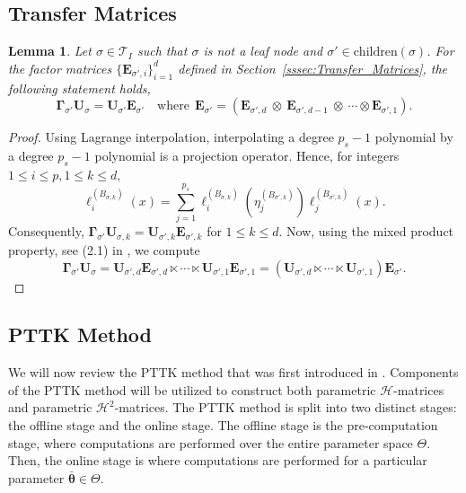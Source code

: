 \documentclass[final,3p,times]{elsarticle}
\newcommand{\mc}[1]{\mathcal{#1}}
\renewcommand{\vec}[1]{\boldsymbol{#1}}
\newcommand{\mat}[1]{\boldsymbol{#1}}
\newtheorem{lemma}{Lemma}
\begin{document}
\subsection{Transfer Matrices}
\begin{lemma}\label{lem:transfer}
Let $\sigma \in \mc{T}_{I}$ such that $\sigma$ is not a leaf node and $\sigma' \in \text{children}(\sigma)$. For the factor matrices $\{\mat{E}_{\sigma', i} \}_{i=1}^{d}$ defined in Section~\ref{sssec:Transfer_Matrices}, the following statement holds,
$$\mat{\Gamma}_{\sigma'}\mat{U}_{\sigma} = \mat{U}_{\sigma'}\mat{E}_{\sigma'} \quad \text{where}  ~~\mat{E}_{\sigma'} = (\mat{E}_{\sigma', d} ~\otimes~ \mat{E}_{\sigma', d-1} ~ \otimes ~ \cdots \otimes \mat{E}_{\sigma', 1}).$$
\end{lemma}
\begin{proof}
Using Lagrange interpolation, interpolating a degree $p_{s}-1$ polynomial by a degree $p_{s}-1$ polynomial is a projection operator. Hence, for  integers $1\le i \le p, 1 \le k \le d$, 
$$\ell_{i}^{(B_{\sigma, k})}(x) = \sum_{j=1}^{p_s}\ell_{i}^{(B_{\sigma, k})}(\eta_{j}^{(B_{\sigma', k})})\ell_{j}^{(B_{\sigma', k})}(x).$$
Consequently, $ \mat{\Gamma}_{\sigma'}\mat{U}_{\sigma, k} = \mat{U}_{\sigma',k}\mat{E}_{\sigma',k}$ for $1 \le k \le d$.
Now, using  the mixed product property, see (2.1) in \cite{khan2025parametric}, we compute 
$$\mat{\Gamma}_{\sigma'}\mat{U}_{\sigma} = \mat{U}_{\sigma', d}\mat{E}_{\sigma', d} \ltimes \cdots  \ltimes \mat{U}_{\sigma', 1}\mat{E}_{\sigma', 1} = (\mat{U}_{\sigma', d} \ltimes \cdots \ltimes \mat{U}_{\sigma', 1})  \mat{E}_{\sigma'}.$$

\end{proof}








\subsection{PTTK Method}\label{ssec:PTTK}
We will now review the PTTK method that was first introduced in \cite{khan2025parametric}. Components of the PTTK method will be utilized to construct both parametric $\mc{H}$-matrices and parametric $\mc{H}^{2}$-matrices. The PTTK method is split into two distinct stages: the offline stage and the online stage. The offline stage is the pre-computation stage, where computations are performed over the entire parameter space $\Theta$. Then, the online stage is where computations are performed for a particular parameter $\bar{\vec{\theta}} \in \Theta$. 
\end{document}
